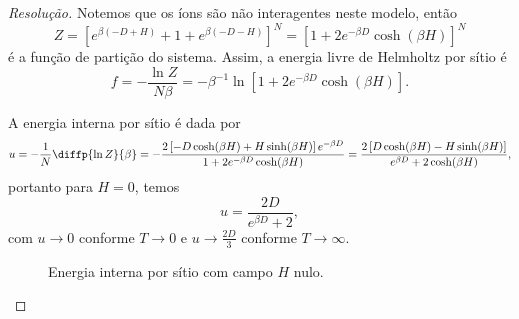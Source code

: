 \begin{proof}[Resolução]
    Notemos que os íons são não interagentes neste modelo, então
    \begin{equation*}
        Z = \left[e^{\beta(-D + H)} + 1 + e^{\beta(-D - H)}\right]^N = \left[1 + 2e^{-\beta D}\cosh(\beta H)\right]^N
    \end{equation*}
    é a função de partição do sistema. Assim, a energia livre de Helmholtz por sítio é
    \begin{equation*}
        f = -\frac{\ln Z}{N \beta } = -\beta^{-1} \ln\left[1 + 2e^{-\beta D}\cosh(\beta H)\right].
    \end{equation*}

    A energia interna por sítio é dada por
    \begin{equation*}
        u = -\frac{1}{N}\diffp{\ln Z}{\beta} = -\frac{2\left[-D\cosh(\beta H) + H \sinh(\beta H)\right]e^{-\beta D}}{1 + 2e^{-\beta D}\cosh(\beta H)} = \frac{2\left[D \cosh(\beta H) - H\sinh(\beta H)\right]}{e^{\beta D} + 2 \cosh(\beta H)},
    \end{equation*}
    portanto para \(H =0\), temos
    \begin{equation*}
        u = \frac{2 D}{e^{\beta D} + 2},
    \end{equation*}
    com \(u \to 0\) conforme \(T \to 0\) e \(u \to \frac{2D}{3}\) conforme \(T \to \infty\).
    \begin{figure}[!ht]
        \centering
        \caption{Energia interna por sítio com campo \(H\) nulo.}
    \end{figure}


\end{proof}

